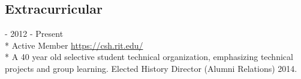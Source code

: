 \documentclass[letter,margin,line]{resume}
\newcommand{\rurl}[1]{\hfill {\footnotesize \url{#1}}}
\newcommand{\rdate}[1]{\hfill {\small #1}}
\renewcommand{\employer}[6]{\item[#1] - #2 \rdate{#3} \\* #4 \rurl{#5}\\* #6}
\begin{document}
\begin{resume}
        \section{\mysidestyle Extracurricular}
        \begin{asparadesc}
            \employer{Computer Science House ({\small CSH})}
                     {}
                     {2012 - Present}
                     {Active Member}
                     {https://csh.rit.edu/}
                     {A 40 year old selective student technical organization,
                      emphasizing technical projects and group learning.
                      Elected History Director (Alumni Relations) 2014.
                     }
        \end{asparadesc}
    \end{resume}
    
\end{document}
